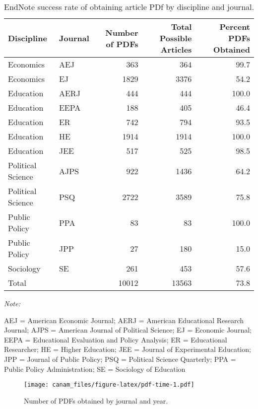 \documentclass[
  english,
  ,man]{apa6}
\begin{document}
\begin{table}[!h]

\caption{\label{tab:setup}EndNote success rate of obtaining article PDf by discipline and journal.}
\centering
\begin{threeparttable}
\begin{tabular}[t]{llrrr}
\toprule
Discipline & Journal & Number of PDFs & Total Possible Articles & Percent PDFs Obtained\\
\midrule
Economics & AEJ & 363 & 364 & 99.7\\
Economics & EJ & 1829 & 3376 & 54.2\\
Education & AERJ & 444 & 444 & 100.0\\
Education & EEPA & 188 & 405 & 46.4\\
Education & ER & 742 & 794 & 93.5\\
\addlinespace
Education & HE & 1914 & 1914 & 100.0\\
Education & JEE & 517 & 525 & 98.5\\
Political Science & AJPS & 922 & 1436 & 64.2\\
Political Science & PSQ & 2722 & 3589 & 75.8\\
Public Policy & PPA & 83 & 83 & 100.0\\
\addlinespace
Public Policy & JPP & 27 & 180 & 15.0\\
Sociology & SE & 261 & 453 & 57.6\\
\hline
Total &  & 10012 & 13563 & 73.8\\
\bottomrule
\end{tabular}
\begin{tablenotes}
\item \textit{Note: } 
\item AEJ = American Economic Journal; AERJ = American Educational Research Journal; AJPS = American Journal of Political Science; EJ = Economic Journal; EEPA = Educational Evaluation and Policy Analysis; ER = Educational Researcher; HE = Higher Education; JEE = Journal of Experimental Education; JPP = Journal of Public Policy; PSQ = Political Science Quarterly; PPA = Public Policy Administration; SE = Sociology of Education
\end{tablenotes}
\end{threeparttable}
\end{table}

\begin{figure}
\centering
\texttt{[image: canam\_files/figure-latex/pdf-time-1.pdf]}
\caption{\label{fig:pdf-time}Number of PDFs obtained by journal and year.}
\end{figure}
\end{document}
